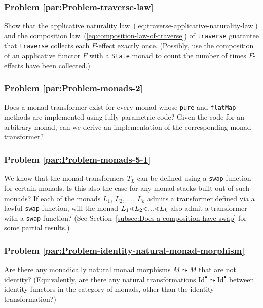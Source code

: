 \subsubsection{Problem \label{par:Problem-traverse-law}\ref{par:Problem-traverse-law}}

Show that the applicative naturality law~(\ref{eq:traverse-applicative-naturality-law})
and the composition law~(\ref{eq:composition-law-of-traverse}) of
\lstinline!traverse! guarantee that \lstinline!traverse! collects
each $F$-effect exactly once. (Possibly, use the composition of an
applicative functor $F$ with a \lstinline!State! monad to count
the number of times $F$-effects have been collected.)

\subsubsection{Problem \label{par:Problem-monads-2}\ref{par:Problem-monads-2}}

Does a monad transformer exist for every monad whose \lstinline!pure!
and \lstinline!flatMap! methods are implemented using fully parametric
code? Given the code for an arbitrary monad, can we derive an implementation
of the corresponding monad transformer?

\subsubsection{Problem \label{par:Problem-monads-5-1}\ref{par:Problem-monads-5-1}}

We know that the monad transformers $T_{L}$ can be defined using
a \lstinline!swap! function for certain monads. Is this also the
case for any monad stacks built out of such monads? If each of the
monads $L_{1}$, $L_{2}$, ..., $L_{k}$ admits a transformer defined
via a lawful \lstinline!swap! function, will the monad $L_{1}\varangle L_{2}\varangle...\varangle L_{k}$
also admit a transformer with a \lstinline!swap! function? (See Section~\ref{subsec:Does-a-composition-have-swap}
for some partial results.)

\subsubsection{Problem \label{par:Problem-identity-natural-monad-morphism}\ref{par:Problem-identity-natural-monad-morphism}}

Are there any monadically natural monad morphisms $M\leadsto M$ that
are not identity? (Equivalently, are there any natural transformations
$\text{Id}^{\bullet}\leadsto\text{Id}^{\bullet}$ between identity
functors in the category of monads, other than the identity transformation?)

